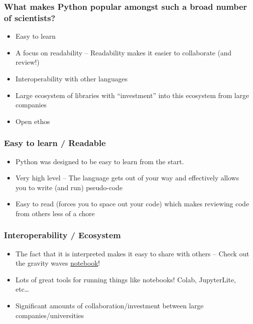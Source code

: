 \documentclass[
    xcolor={svgnames,dvipsnames},
    hyperref={colorlinks, citecolor=DeepPink4, linkcolor=DarkRed, urlcolor=DarkBlue}
]{beamer}  %
\newcommand{\1}{\mathbbm 1}
\begin{document}
\begin{frame}
    \frametitle{What makes Python popular amongst such a broad number of scientists?}

    \begin{itemize}
        \item Easy to learn
        \item A focus on readability -- Readability makes it easier to collaborate (and review!)
        \item Interoperability with other languages
        \item Large ecosystem of libraries with ``investment'' into this ecosystem from large companies
        \item Open ethos
    \end{itemize}

\end{frame}

\begin{frame}
    \frametitle{Easy to learn / Readable}

    \begin{itemize}
        \item Python was designed to be easy to learn from the start.
        \item Very high level -- The language gets out of your way and effectively allows you to
            write (and run) pseudo-code
        \item Easy to read (forces you to space out your code) which makes reviewing code from
            others less of a chore
    \end{itemize}

\end{frame}

\begin{frame}
    \frametitle{Interoperability / Ecosystem}

    \begin{itemize}
        \item The fact that it is interpreted makes it easy to share with others -- Check out the
            gravity waves \href{https://gwosc.org/s/events/GW150914/GW150914_tutorial.html}{notebook}!
        \item Lots of great tools for running things like notebooks! Colab, JupyterLite, etc\dots
        \item Significant amounts of collaboration/investment between large companies/universities
    \end{itemize}

\end{frame}
\end{document}
